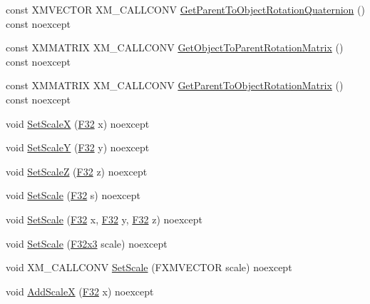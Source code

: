 \begin{DoxyCompactItemize}
\item 
const X\+M\+V\+E\+C\+T\+OR X\+M\+\_\+\+C\+A\+L\+L\+C\+O\+NV \hyperlink{classmage_1_1_transform_adb8a034a1abc3a7d0e2cfd92867596e2}{Get\+Parent\+To\+Object\+Rotation\+Quaternion} () const noexcept
\item 
const X\+M\+M\+A\+T\+R\+IX X\+M\+\_\+\+C\+A\+L\+L\+C\+O\+NV \hyperlink{classmage_1_1_transform_a2f86a149ce70931f0019ebbe740ba30f}{Get\+Object\+To\+Parent\+Rotation\+Matrix} () const noexcept
\item 
const X\+M\+M\+A\+T\+R\+IX X\+M\+\_\+\+C\+A\+L\+L\+C\+O\+NV \hyperlink{classmage_1_1_transform_a95019381ff6b40edc197743ac93126c6}{Get\+Parent\+To\+Object\+Rotation\+Matrix} () const noexcept
\item 
void \hyperlink{classmage_1_1_transform_a6adbe2205f8db80107a2046eb7a9566a}{Set\+ScaleX} (\hyperlink{namespacemage_aa97e833b45f06d60a0a9c4fc22ae02c0}{F32} x) noexcept
\item 
void \hyperlink{classmage_1_1_transform_a953a89b7f7ed2ec47eb05074d43e35c6}{Set\+ScaleY} (\hyperlink{namespacemage_aa97e833b45f06d60a0a9c4fc22ae02c0}{F32} y) noexcept
\item 
void \hyperlink{classmage_1_1_transform_aa8fa7169c739cd1e005bbb373ccbf6c3}{Set\+ScaleZ} (\hyperlink{namespacemage_aa97e833b45f06d60a0a9c4fc22ae02c0}{F32} z) noexcept
\item 
void \hyperlink{classmage_1_1_transform_acf366489ae37e771e3f7b06c6452cb33}{Set\+Scale} (\hyperlink{namespacemage_aa97e833b45f06d60a0a9c4fc22ae02c0}{F32} s) noexcept
\item 
void \hyperlink{classmage_1_1_transform_a0a2d5430c745a27c5acaff472ba8b82e}{Set\+Scale} (\hyperlink{namespacemage_aa97e833b45f06d60a0a9c4fc22ae02c0}{F32} x, \hyperlink{namespacemage_aa97e833b45f06d60a0a9c4fc22ae02c0}{F32} y, \hyperlink{namespacemage_aa97e833b45f06d60a0a9c4fc22ae02c0}{F32} z) noexcept
\item 
void \hyperlink{classmage_1_1_transform_af58ea183306870969dd4e2864630cfa7}{Set\+Scale} (\hyperlink{namespacemage_a73fbe0da4b8d5bc156bb8453e5b63a17}{F32x3} scale) noexcept
\item 
void X\+M\+\_\+\+C\+A\+L\+L\+C\+O\+NV \hyperlink{classmage_1_1_transform_a7dd2ca0ee43f956f1a6db79f83c14983}{Set\+Scale} (F\+X\+M\+V\+E\+C\+T\+OR scale) noexcept
\item 
void \hyperlink{classmage_1_1_transform_ae2f2f2109aca3c2c34ea1601d392e6a4}{Add\+ScaleX} (\hyperlink{namespacemage_aa97e833b45f06d60a0a9c4fc22ae02c0}{F32} x) noexcept
\item 

\end{DoxyCompactItemize}
